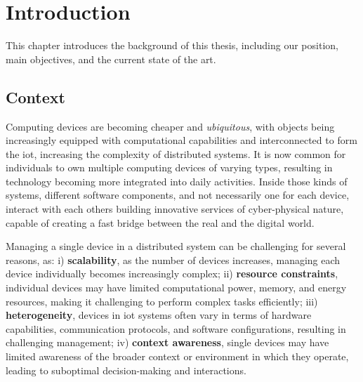 
\chapter{Introduction}
\label{ch:introduction}
This chapter introduces the background of this thesis, including our position, main objectives,
and the current state of the art.

\section{Context}
\label{sec:context}

Computing devices are becoming cheaper and \emph{ubiquitous}, with objects being increasingly equipped with
computational capabilities and interconnected to form the \ac{iot}, increasing the complexity of
distributed systems.
It is now common for individuals to own multiple computing devices of varying types, resulting in technology becoming
more integrated into daily activities.
Inside those kinds of systems, different software components, and not necessarily one for each device, interact with each
others building innovative services of cyber-physical nature, capable of creating a fast bridge between the real and
the digital world.

Managing a single device in a distributed system can be challenging for several reasons, as:
    i) \textbf{scalability}, as the number of devices increases, managing each device individually becomes increasingly complex;
    ii) \textbf{resource constraints}, individual devices may have limited computational power, memory, and energy resources,
        making it challenging to perform complex tasks efficiently;
    iii) \textbf{heterogeneity}, devices in \ac{iot} systems often vary in terms of hardware capabilities, communication
        protocols, and software configurations, resulting in challenging management;
    iv) \textbf{context awareness}, single devices may have limited awareness of the broader context or environment in
        which they operate, leading to suboptimal decision-making and interactions.

